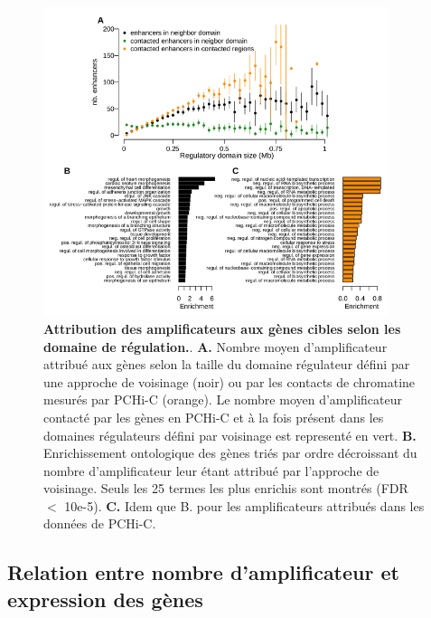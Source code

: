 \begin{figure}[H]
    \centering
    \includegraphics[width=0.9\textwidth, page=1]{figures/chap2/chap2-fig6.png}
    \caption[Attribution des amplificateurs aux gènes cibles selon les domaines de régulation.]{
    \textbf{Attribution des amplificateurs aux gènes cibles selon les domaine de régulation.}.
    \textbf{A.} Nombre moyen d'amplificateur attribué aux gènes selon la taille du domaine régulateur défini par une approche de voisinage (noir) ou par les contacts de chromatine mesurés par \gls{PCHi-C} (orange). Le nombre moyen  d'amplificateur contacté par les gènes en \gls{PCHi-C} et à la fois présent dans les domaines régulateurs défini par voisinage est representé en vert. 
    \textbf{B.} Enrichissement ontologique des gènes triés par ordre décroissant du nombre d'amplificateur leur étant attribué par l'approche de voisinage. Seuls les 25 termes les plus enrichis sont montrés (FDR $<$ 10e-5).
    \textbf{C.} Idem que B. pour les amplificateurs attribués dans les données de \gls{PCHi-C}.
    }
    \label{fig:chap2-fig6}
\end{figure}

\subsection{Relation entre nombre d’amplificateur et expression des gènes}
\label{subsec:complexite-expression}

